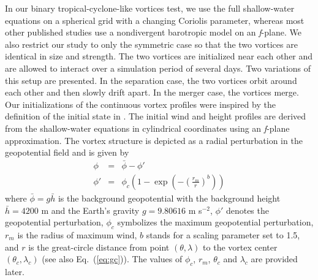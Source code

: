 In our binary tropical-cyclone-like vortices test, we use the full
shallow-water equations on a spherical grid with a changing Coriolis
parameter, whereas most other published studies use a nondivergent
barotropic model on an \emph{f}-plane.  We also restrict our study to only the
symmetric case so that the two vortices are identical in size and
strength.  The two vortices are initialized near each other and are
allowed to interact over a simulation period of several days.
Two variations of this setup are presented.  In the separation case, the two
vortices orbit around each other and then slowly drift apart.  In the
merger case, the vortices merge.  Our initializations of the continuous
vortex profiles were inspired by the definition of the initial state in
\cite{Holland:1993ij}.  The initial wind and height profiles are derived
from the shallow-water equations in cylindrical coordinates using an
\emph{f}-plane approximation.  The vortex structure is depicted as a radial
perturbation in the geopotential field and is given by
\begin{eqnarray}
    \label{eq:svgeopot} \phi & = & \bar{\phi} - \phi' \\
    \phi' & = & \phi_c\left(1-\exp\left(-\left(\frac{r_m}{r}\right)^b\right)\right)
    \label{eq:geo_perturb}
\end{eqnarray}
where $\bar{\phi} = g \bar{h}$ is the background geopotential with the 
background height $\bar{h} = 4200$ m and the Earth's gravity $g= 9.80616$ m s$^{-2}$,  $\phi'$ denotes the geopotential perturbation, 
$\phi_c$ symbolizes the maximum geopotential perturbation, $r_m$ is the radius of maximum wind, $b$ stands for a scaling
parameter set to 1.5, and $r$ is the great-circle distance from point 
$(\theta ,\lambda)$ to the vortex center $(\theta_c,\lambda_c)$ (see also Eq.~(\ref{eq:gc})).  The values of 
$\phi_c$, $r_m$, $\theta_c$ and $\lambda_c$ are provided later.

